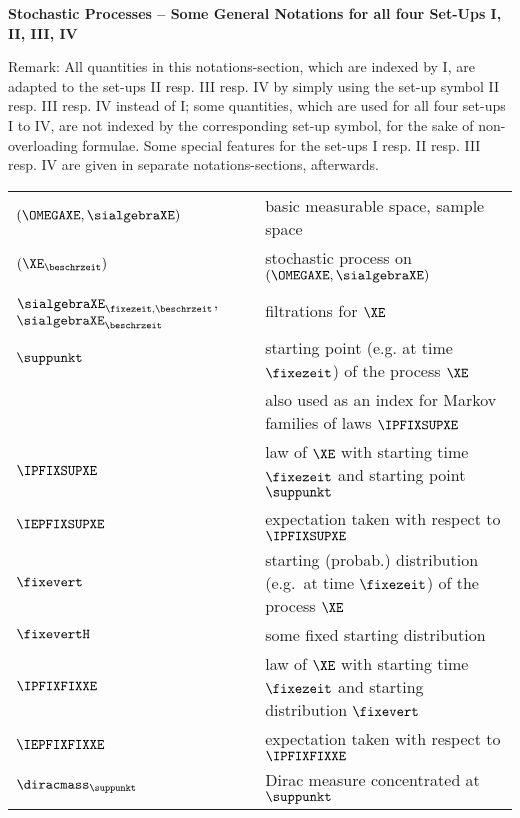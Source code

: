 
{\large \bf Stochastic Processes -- Some General Notations for all four Set-Ups I, II, III, IV}

Remark: All quantities in this notations-section,  which are indexed by I, are adapted to the set-ups
II resp. III resp. IV by simply using the set-up symbol II resp. III resp. IV instead
of I;
some quantities, which are used for all four set-ups I to IV, are not indexed by the corresponding set-up symbol, for the sake of non-overloading formulae. Some special features for the
set-ups I resp. II resp. III resp. IV are given in separate
   notations-sections, afterwards. 


\begin{longtable}{ll}

$(\OMEGAXE,\sialgebraXE)$  & basic measurable space, sample space 
\\
$(\XE_{\beschrzeit})$ & stochastic process on $(\OMEGAXE,\sialgebraXE)$ 
\\
$\sialgebraXE_{\fixezeit,\beschrzeit}$, $\sialgebraXE_{\beschrzeit}$ & filtrations for $\XE$ 
\\
$\suppunkt$ & starting point (e.g. at time $\fixezeit$) of the process $\XE$ 
\\
$\ $ & also used as an index for Markov families of laws $\IPFIXSUPXE$
\\
$\IPFIXSUPXE$ &  law of $\XE$ with starting time $\fixezeit$ and starting point $\suppunkt$  
\\
$\IEPFIXSUPXE$ & expectation taken with respect to $\IPFIXSUPXE$
\\
$\fixevert$ & starting (probab.) distribution (e.g.\ at time $\fixezeit$) of the process $\XE$ 
\\
$\fixevertH$ & some fixed starting distribution
\\
$\IPFIXFIXXE$ &  law of $\XE$ with starting time $\fixezeit$ and starting distribution $\fixevert$  
\\
$\IEPFIXFIXXE$ & expectation taken with respect to $\IPFIXFIXXE$
\\
$\diracmass_{\suppunkt}$ & Dirac measure concentrated at $\suppunkt$
\\
 

\end{longtable}




